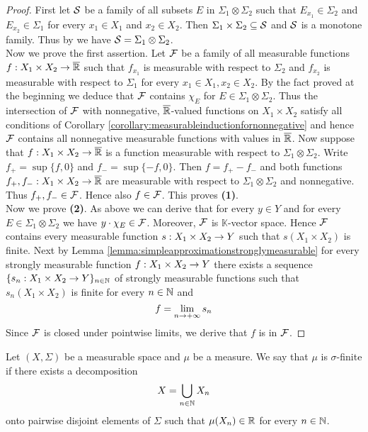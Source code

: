 \begin{proof}
First let ${\mathcal S}$ be a family of all subsets $E$ in $\Sigma_1\otimes \Sigma_2$ such that $E_{x_1}\in \Sigma_2$ and $E_{x_2}\in \Sigma_1$ for every $x_1\in X_1$ and $x_2\in X_2$. Then $\Sigma_1\times \Sigma_2\subseteq {\mathcal S}$ and ${\mathcal S}$ is a monotone family. Thus by {\cite[Theorem 1.5]{Introductiontomeasuretheory}} we have ${\mathcal S} = \Sigma_1\otimes \Sigma_2$.\\
Now we prove the first assertion. Let ${\mathcal F}$ be a family of all measurable functions $f:X_1\times X_2\rightarrow \overline{{\mathbb R}}$ such that $f_{x_1}$ is measurable with respect to $\Sigma_2$ and $f_{x_2}$ is measurable with respect to $\Sigma_1$ for every $x_1\in X_1,x_2\in X_2$. By the fact proved at the beginning we deduce that ${\mathcal F}$ contains $\chi_E$ for $E\in \Sigma_1\otimes \Sigma_2$. Thus the intersection of ${\mathcal F}$ with nonnegative, $\overline{{\mathbb R}}$-valued functions on $X_1\times X_2$ satisfy all conditions of Corollary \ref{corollary:measurableinductionfornonnegative} and hence ${\mathcal F}$ contains all nonnegative measurable functions with values in $\overline{{\mathbb R}}$. Now suppose that $f:X_1\times X_2\rightarrow \overline{{\mathbb R}}$ is a function measurable with respect to $\Sigma_1\otimes \Sigma_2$. Write $f_+ = \sup\{f, 0\}$ and $f_- = \sup\{-f, 0\}$. Then $f = f_+ - f_-$ and both functions $f_+,f_-:X_1\times X_2\rightarrow \overline{{\mathbb R}}$ are measurable with respect to $\Sigma_1\otimes \Sigma_2$ and nonnegative. Thus $f_+,f_-\in {\mathcal F}$. Hence also $f\in {\mathcal F}$. This proves \textbf{(1)}.\\
Now we prove \textbf{(2)}. As above we can derive that for every $y\in Y$ and for every $E\in \Sigma_1\otimes \Sigma_2$ we have $y\cdot \chi_E\in {\mathcal F}$. Moreover, ${\mathcal F}$ is $\mathbb{K}$-vector space. Hence ${\mathcal F}$ contains every measurable function $s:X_1\times X_2\rightarrow Y$ such that $s(X_1\times X_2)$ is finite. Next by Lemma \ref{lemma:simpleapproximationstronglymeasurable} for every strongly measurable function $f:X_1\times X_2\rightarrow Y$ there exists a sequence $\{s_n:X_1\times X_2\rightarrow Y\}_{n\in {\mathbb N}}$ of strongly measurable functions such that $s_n(X_1\times X_2)$ is finite for every $n\in {\mathbb N}$ and
$$f = \lim_{n\rightarrow +\infty}s_n$$
Since ${\mathcal F}$ is closed under pointwise limits, we derive that $f$ is in ${\mathcal F}$.
\end{proof}

\begin{definition}
Let $(X,\Sigma)$ be a measurable space and $\mu$ be a measure. We say that $\mu$ is $\sigma$-finite if there exists a decomposition
$$X = \bigcup_{n\in {\mathbb N}}X_n$$
onto pairwise disjoint elements of $\Sigma$ such that $\mu(X_n)\in {\mathbb R}$ for every $n\in {\mathbb N}$.
\end{definition}

